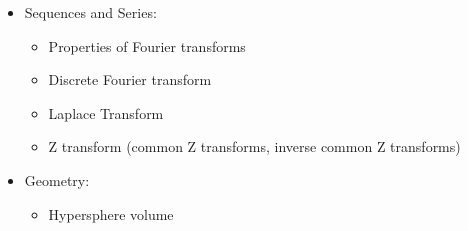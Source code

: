 \begin{itemize}
\begin{itemize}
				\item ANCOVA
				\item Wald-Wolfowitz Test (binary sequence)
				\item Levene-Wolfwitz Test\footnote{also named "turning point test" or "trend test"} (continuous up/down sequence)
				\item Risk Ratio and its confidence interval
				\item Ellipse of control
				\item Entropy-based measures of contingency tables
				\item Armitage trend test
				\item Ansari-Bradley test
				\item Regular Dickey-Fuller test
				\item Poisson Model for the average (2D) spatial distance
				\item Canonical Correlation
				\item G-test of periodicity
				\item Gaussian and Student copula
				\item Introduction to MANOVA
				\item Extreme Values Theorem
				\item Survey Theory
				\item Generalized Linear Models (Gauss, Poissson, Negative Binomial, Gamma)
				\item PLS Regression (partial least squares)
				\item Two Stage Least Squares (2SLS)
				\item Logic regression
				\item Adjusted Chi-squared
				\item Probability of generating functions
			\end{itemize}
		\item Sequences and Series:
			\begin{itemize}
				\item Properties of Fourier transforms	
				\item Discrete Fourier transform			
				\item Laplace Transform
				\item Z transform (common Z transforms, inverse common Z transforms)
			\end{itemize}
		\item Geometry:
			\begin{itemize}
				\item Hypersphere volume
			\end{itemize}

\end{itemize}
